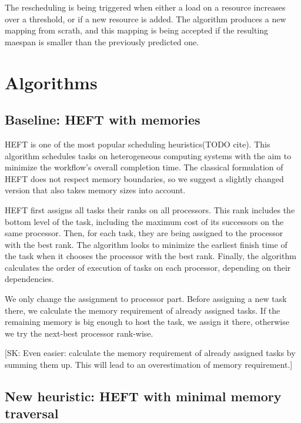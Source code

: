 \documentclass[sigconf,review,anonymous]{acmart}
\newcommand{\algo}[1]{\textsc{#1}}
\newcommand{\skug}[1]{{\color{blue}[SK: #1]}}
\begin{document}
    The rescheduling is being triggered when either a load on a resource increases over a threshold, or if a new resource
    is added.
    The algorithm produces a new mapping from scrath, and this mapping is being accepted if the resulting maespan is
    smaller than the previously predicted one.



    \section{Algorithms}

    \subsection{Baseline: HEFT with memories}

    \algo{HEFT} is one of the most popular scheduling heuristics(TODO cite).
    This algorithm schedules tasks on heterogeneous computing systems with the aim to minimize
    the workflow's overall completion time.
    The classical formulation of \algo{HEFT} does not respect memory boundaries, so we suggest a
    slightly changed version that also takes memory sizes into account.

    \algo{HEFT} first assigns all tasks their ranks on all processors.
    This rank includes the bottom level of the task, including the maximum cost of its successors on the same processor.
    Then, for each task, they are being assigned to the processor with the best rank.
    The algorithm looks to minimize the earliest finish time of the task when it chooses the processor with the best rank.
    Finally, the algorithm calculates the order of execution of tasks on each processor, depending on their dependencies.

    We only change the assignment to processor part.
    Before assigning a new task there, we calculate the memory requirement of already assigned tasks.
    If the remaining memory is big enough to host the task, we assign it there, otherwise we try the next-best processor
    rank-wise.

    \skug{Even easier: calculate the memory requirement of already assigned tasks by summing them up. This will lead
    to an overestimation of memory requirement.}


    \subsection{New heuristic: HEFT with minimal memory traversal}
\end{document}
